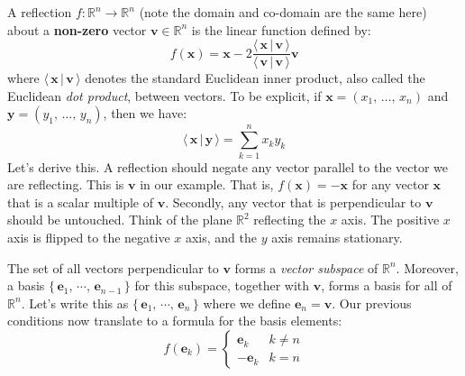 \documentclass{article}
\theoremstyle{normal}
\newenvironment{example}{%
    \pushQED{\qed}\renewcommand{\qedsymbol}{$\blacksquare$}\examplex%
}{%
    \popQED\endexamplex%
}
\begin{document}
    \begin{example}[\textbf{Reflections}]
        A reflection $f:\mathbb{R}^{n}\rightarrow\mathbb{R}^{n}$ (note the
        domain and co-domain are the same here) about a \textbf{non-zero}
        vector $\mathbf{v}\in\mathbb{R}^{n}$ is the linear function defined by:
        \begin{equation}
            f(\mathbf{x})
            =\mathbf{x}-2
            \frac{\langle\,\mathbf{x}\,|\,\mathbf{v}\,\rangle}
                 {\langle\,\mathbf{v}\,|\,\mathbf{v}\,\rangle}
            \mathbf{v}
        \end{equation}
        where $\langle\,\mathbf{x}\,|\,\mathbf{v}\,\rangle$ denotes the
        standard Euclidean inner product, also called the Euclidean
        \textit{dot product}, between vectors. To be explicit, if
        $\mathbf{x}=(x_{1},\,\dots,\,x_{n})$ and
        $\mathbf{y}=(y_{1},\,\dots,\,y_{n})$, then we have:
        \begin{equation}
            \langle\,\mathbf{x}\,|\,\mathbf{y}\,\rangle
            =\sum_{k=1}^{n}x_{k}y_{k}
        \end{equation}
        Let's derive this. A reflection should negate any vector parallel to
        the vector we are reflecting. This is $\mathbf{v}$ in our example.
        That is, $f(\mathbf{x})=-\mathbf{x}$ for any vector $\mathbf{x}$ that
        is a scalar multiple of $\mathbf{v}$. Secondly, any vector that is
        perpendicular to $\mathbf{v}$ should be untouched. Think of the plane
        $\mathbb{R}^{2}$ reflecting the $x$ axis. The positive $x$ axis is
        flipped to the negative $x$ axis, and the $y$ axis remains stationary.
        \par\hfill\par
        The set of all vectors perpendicular to $\mathbf{v}$ forms a
        \textit{vector subspace} of $\mathbb{R}^{n}$. Moreover, a basis
        $\{\,\mathbf{e}_{1},\,\cdots,\,\mathbf{e}_{n-1}\,\}$ for this subspace,
        together with $\mathbf{v}$, forms a basis for all of $\mathbb{R}^{n}$.
        Let's write this as $\{\,\mathbf{e}_{1},\,\cdots,\,\mathbf{e}_{n}\,\}$
        where we define $\mathbf{e}_{n}=\mathbf{v}$. Our previous conditions
        now translate to a formula for the basis elements:
        \begin{equation}
            f(\mathbf{e}_{k})=
            \begin{cases}
                \mathbf{e}_{k}&k\ne{n}\\
                -\mathbf{e}_{k}&k=n

\end{cases}
\end{equation}
\end{example}
\end{document}
